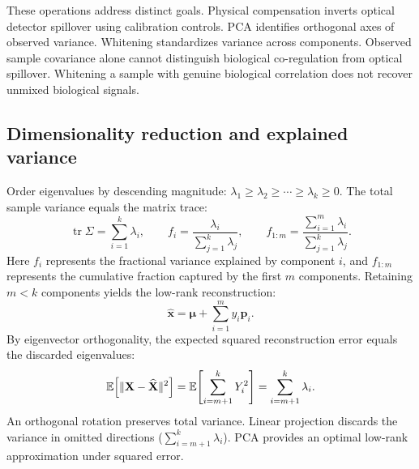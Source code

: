 These operations address distinct goals. Physical compensation inverts optical detector spillover using calibration controls. PCA identifies orthogonal axes of observed variance. Whitening standardizes variance across components. Observed sample covariance alone cannot distinguish biological co-regulation from optical spillover. Whitening a sample with genuine biological correlation does not recover unmixed biological signals.

\subsection{Dimensionality reduction and explained variance}
\label{subsec:l05-truncation}
Order eigenvalues by descending magnitude: $\lambda_1\geq\lambda_2\geq\cdots\geq\lambda_k\geq0$. The total sample variance equals the matrix trace:
\begin{equation}
\operatorname{tr}\Sigma=\sum_{i=1}^k\lambda_i,
\qquad
f_i=\frac{\lambda_i}{\sum_{j=1}^k\lambda_j},\qquad
f_{1:m}=\frac{\sum_{i=1}^m\lambda_i}{\sum_{j=1}^k\lambda_j}.
\label{eq:l05-explained-variance}
\end{equation}
Here $f_i$ represents the fractional variance explained by component $i$, and $f_{1:m}$ represents the cumulative fraction captured by the first $m$ components. Retaining $m < k$ components yields the low-rank reconstruction:
\begin{equation}
\widehat{\mathbf x}=\boldsymbol\mu+\sum_{i=1}^m y_i\mathbf p_i.
\label{eq:l05-reconstruction}
\end{equation}
By eigenvector orthogonality, the expected squared reconstruction error equals the discarded eigenvalues:
\begin{equation}
\mathbb E\!\left[\lVert\mathbf X-\widehat{\mathbf X}\rVert^2\right]
=\mathbb E\!\left[\sum_{i=m+1}^kY_i^2\right]
=\sum_{i=m+1}^k\lambda_i.
\label{eq:l05-discarded-variance}
\end{equation}
An orthogonal rotation preserves total variance. Linear projection discards the variance in omitted directions ($\sum_{i=m+1}^k \lambda_i$). PCA provides an optimal low-rank approximation under squared error.

